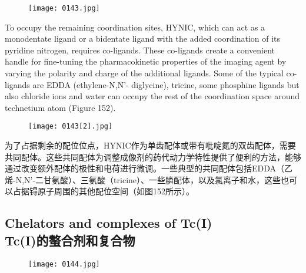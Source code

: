 \documentclass[dvipsnames, svgnames,a4paper,11pt]{article}
\begin{document}
\begin{figure}[h]
	\centering
    \texttt{[image: 0143.jpg]}    
     \label{fig151}
\end{figure}

To occupy the remaining coordination sites, HYNIC, which can act as a monodentate
ligand or a bidentate ligand with the added coordination of its pyridine nitrogen,
requires co-ligands. These co-ligands create a convenient handle for fine-tuning the
pharmacokinetic properties of the imaging agent by varying the polarity and charge
of the additional ligands. Some of the typical co-ligands are EDDA (ethylene-N,N'-
diglycine), tricine, some phosphine ligands but also chloride ions and water can
occupy the rest of the coordination space around technetium atom (Figure 152). 

\begin{figure}[H]
	\centering
    \texttt{[image: 0143[2].jpg]}    
     \label{fig152}
\end{figure}

为了占据剩余的配位位点，HYNIC作为单齿配体或带有吡啶氮的双齿配体，需要共同配体。这些共同配体为调整成像剂的药代动力学特性提供了便利的方法，能够通过改变额外配体的极性和电荷进行微调。一些典型的共同配体包括EDDA（乙烯-N,N'-二甘氨酸）、三氨酸（tricine）、一些膦配体，以及氯离子和水，这些也可以占据锝原子周围的其他配位空间（如图152所示）。



\subsection{Chelators and complexes of Tc(I) \\Tc(I)的螯合剂和复合物}
\begin{figure}[h]
	\centering
    \texttt{[image: 0144.jpg]}    
     \label{fig153}
\end{figure}
\end{document}
